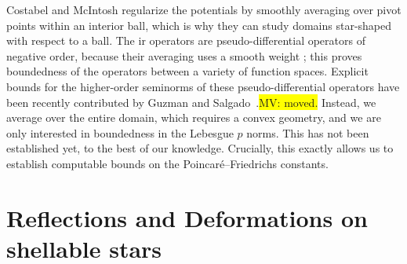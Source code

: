 \documentclass[10pt,letterpaper]{article}
\newcommand{\todo}[1]{{\colorbox{yellow}{#1}}}
\newcommand\cye[1]{%
\protect\leavevmode
\begingroup
    \color{red!35!yellow}%
    #1%
\endgroup
}
\begin{document}
\begin{remark}
    {\color{blue}
    Costabel and McIntosh regularize the potentials by smoothly averaging over pivot points within an interior ball, 
    which is why they \cye{can} study domains star-shaped with respect to a ball. 
    The\cye{ir} operators are pseudo-differential operators of negative order, 
    because their averaging uses a smooth weight\cye{; this} proves boundedness of the operators between a variety of function spaces. 
    Explicit bounds for the higher-order seminorms of these pseudo-differential operators 
    have been \cye{recently} contributed by Guzman and Salgado~\cite{guzman2021estimation}.\todo{MV: moved.}
    Instead, we average over the entire domain, which requires a convex geometry, \cye{and we are only interested in boundedness in the Lebesgue $p$ norms.} This has not been established yet, to the best of our knowledge. \cye{Crucially, this exactly allows us to} establish \cye{computable bounds on the} Poincar\'e--Friedrichs constants.   
    }
\end{remark}














































\section{Reflections and Deformations on shellable stars}\label{section:extension}
\end{document}
